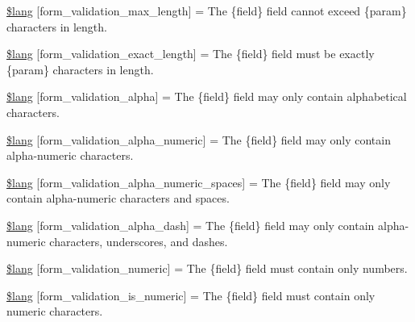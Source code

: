 \begin{DoxyCompactItemize}
\item 
\mbox{\hyperlink{form__validation__lang_8php_acb1f5fa772e61a5ee9c619744b2e8b4d}{\$lang}} \mbox{[}\textquotesingle{}form\+\_\+validation\+\_\+max\+\_\+length\textquotesingle{}\mbox{]} = \textquotesingle{}The \{field\} field cannot exceed \{param\} characters in length.\textquotesingle{}
\item 
\mbox{\hyperlink{form__validation__lang_8php_af3bc1553bbee67384ccabfb19f901a0a}{\$lang}} \mbox{[}\textquotesingle{}form\+\_\+validation\+\_\+exact\+\_\+length\textquotesingle{}\mbox{]} = \textquotesingle{}The \{field\} field must be exactly \{param\} characters in length.\textquotesingle{}
\item 
\mbox{\hyperlink{form__validation__lang_8php_ae29211484726ff85b1243d8736664db4}{\$lang}} \mbox{[}\textquotesingle{}form\+\_\+validation\+\_\+alpha\textquotesingle{}\mbox{]} = \textquotesingle{}The \{field\} field may only contain alphabetical characters.\textquotesingle{}
\item 
\mbox{\hyperlink{form__validation__lang_8php_a868f2756e3f0886b6b35cb879878be17}{\$lang}} \mbox{[}\textquotesingle{}form\+\_\+validation\+\_\+alpha\+\_\+numeric\textquotesingle{}\mbox{]} = \textquotesingle{}The \{field\} field may only contain alpha-\/numeric characters.\textquotesingle{}
\item 
\mbox{\hyperlink{form__validation__lang_8php_ae6c93d16569d49fd9e9bda81a1dc46e6}{\$lang}} \mbox{[}\textquotesingle{}form\+\_\+validation\+\_\+alpha\+\_\+numeric\+\_\+spaces\textquotesingle{}\mbox{]} = \textquotesingle{}The \{field\} field may only contain alpha-\/numeric characters and spaces.\textquotesingle{}
\item 
\mbox{\hyperlink{form__validation__lang_8php_a65e5c17cc79ed4481910f1d26f684957}{\$lang}} \mbox{[}\textquotesingle{}form\+\_\+validation\+\_\+alpha\+\_\+dash\textquotesingle{}\mbox{]} = \textquotesingle{}The \{field\} field may only contain alpha-\/numeric characters, underscores, and dashes.\textquotesingle{}
\item 
\mbox{\hyperlink{form__validation__lang_8php_aae9865438558fdb469fd952f683f29c4}{\$lang}} \mbox{[}\textquotesingle{}form\+\_\+validation\+\_\+numeric\textquotesingle{}\mbox{]} = \textquotesingle{}The \{field\} field must contain only numbers.\textquotesingle{}
\item 
\mbox{\hyperlink{form__validation__lang_8php_a91d65bc40a96da1fb551ab491da779fc}{\$lang}} \mbox{[}\textquotesingle{}form\+\_\+validation\+\_\+is\+\_\+numeric\textquotesingle{}\mbox{]} = \textquotesingle{}The \{field\} field must contain only numeric characters.\textquotesingle{}

\end{DoxyCompactItemize}
